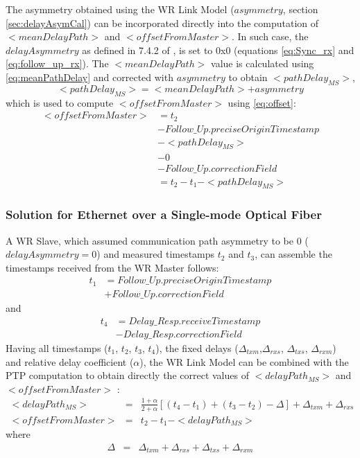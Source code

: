 \documentclass[a4paper, 12pt]{article}
\begin{document}
The asymmetry obtained using the WR Link Model ($asymmetry$, section \ref{sec:delayAsymCal})  
can be incorporated directly into the computation 
of $<meanDelayPath>$ and $<offsetFromMaster>$. In such case, the $delayAsymmetry$ as defined 
in 7.4.2 of \cite{IEEE1588}, is set to 0x0 (equations \eqref{eq:Sync_rx} and 
\eqref{eq:follow_up_rx}). The $<meanDelayPath>$ value is calculated using \eqref{eq:meanPathDelay} 
and corrected with $asymmetry$ to obtain $<pathDelay_{MS}>$,
\begin{equation}
\label{eq:pathDelayMS}
  <pathDelay_{MS}>= <meanDelayPath> + asymmetry
\end{equation}
which is used to compute $<offsetFromMaster>$ using \eqref{eq:offset}:
\begin{align}
  \label{eq:WRoffset}
  <offsetFromMaster> &=t_2 \\
\nonumber	  &- Follow\_Up.preciseOriginTimestamp \\
\nonumber	  &- <pathDelay_{MS}> \\
\nonumber	  &- 0 \\
\nonumber	  &- Follow\_Up.correctionField \\
		  &=t_{2}-t_1 - <pathDelay_{MS}>
\end{align}


\subsubsection{Solution for Ethernet over a Single-mode Optical Fiber}

A WR Slave, which assumed communication path asymmetry to be 0 ($delayAsymmetry=0$) and measured
timestamps $t_2$ and $t_3$, can assemble the timestamps received from the WR Master follows:
\begin{align}
  \label{eq:t1}
	    t_1 &= Follow\_Up.preciseOriginTimestamp \\
 \nonumber 	&+ Follow\_Up.correctionField 
\end{align}
and
\begin{align}
  \label{eq:t4}
	    t_{4} 	&= Delay\_Resp.receiveTimestamp \\
\nonumber		&- Delay\_Resp.correctionField 	
\end{align}
Having all timestamps ($t_1$, $t_2$, $t_3$, $t_4$), the fixed delays 
($\Delta_{txm}$,$\Delta_{rxs}$, $\Delta_{txs}$, $\Delta_{rxm}$) and relative delay coefficient 
($\alpha$), the WR Link Model can be combined with the PTP computation to obtain directly the 
correct values of $<delayPath_{MS}>$ and $<offsetFromMaster>$ :
\begin{eqnarray}
  <delayPath_{MS}> & = & \frac{1+\alpha}{2+\alpha} 
			[(t_4-t_1) + (t_3-t_2) - \Delta] + \Delta_{txm} + \Delta_{rxs} \\
  <offsetFromMaster> & = & t_{2} - t_{1}  - <delayPath_{MS}>
\end{eqnarray}
where
\begin{eqnarray}
  \Delta & = & \Delta_{txm} + \Delta_{rxs} + \Delta_{txs} + \Delta_{rxm}
\end{eqnarray}
\end{document}
